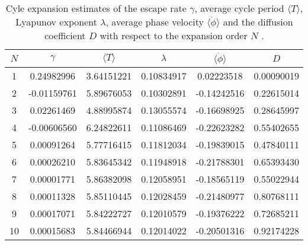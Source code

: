 \begin{table}
	\begin{tabular}{c|c|c|c|c|c}
	 $N$ & $\gamma$ & $\langle T \rangle$ & $\lambda$ & $\langle \dot{\phi} \rangle$ & $D$ \\ 
	\hline
	1 & 0.24982996 & 3.64151221 & 0.10834917 & 0.02223518 & 0.00090019 \\ 
 	2 & -0.01159761 & 5.89676053 & 0.10302891 & -0.14242516 & 0.22615014 \\ 
 	3 & 0.02261469 & 4.88995874 & 0.13055574 & -0.16698925 & 0.28645997 \\ 
 	4 & -0.00606560 & 6.24822611 & 0.11086469 & -0.22623282 & 0.55402655 \\ 
 	5 & 0.00091264 & 5.77716415 & 0.11812034 & -0.19839015 & 0.47840111 \\ 
 	6 & 0.00026210 & 5.83645342 & 0.11948918 & -0.21788301 & 0.65393430 \\ 
 	7 & 0.00001771 & 5.86382098 & 0.12058951 & -0.18565119 & 0.55022944 \\ 
 	8 & 0.00011328 & 5.85110445 & 0.12028459 & -0.21480977 & 0.80768111 \\ 
 	9 & 0.00017071 & 5.84222727 & 0.12010579 & -0.19376222 & 0.72685211 \\ 
 	10 & 0.00015683 & 5.84466944 & 0.12014022 & -0.20501316 & 0.92174228 \\ 
 	\end{tabular}
	\caption{Cyle expansion estimates of the escape rate $\gamma$, average cycle period $\langle T \rangle$, Lyapunov exponent $\lambda$, average phase velocity $\langle \dot{\phi} \rangle$ and the diffusion coefficient $D$ with respect to the expansion order $N$ .}
	\label{t-DynamicalAveragesNoGrammar}
\end{table}

